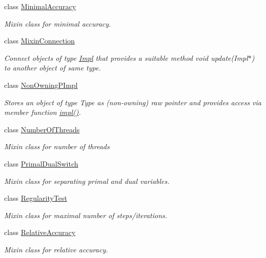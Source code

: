 \begin{DoxyCompactItemize}
class \hyperlink{classSpacy_1_1Mixin_1_1MinimalAccuracy}{Minimal\+Accuracy}
\begin{DoxyCompactList}\small\item\em Mixin class for minimal accuracy. \end{DoxyCompactList}\item 
class \hyperlink{classSpacy_1_1Mixin_1_1MixinConnection}{Mixin\+Connection}
\begin{DoxyCompactList}\small\item\em Connect objects of type \hyperlink{classSpacy_1_1Mixin_1_1Impl}{Impl} that provides a suitable method void update(\+Impl$\ast$) to another object of same type. \end{DoxyCompactList}\item 
class \hyperlink{classSpacy_1_1Mixin_1_1NonOwningPImpl}{Non\+Owning\+P\+Impl}
\begin{DoxyCompactList}\small\item\em Stores an object of type Type as (non-\/owning) raw pointer and provides access via member function \hyperlink{classSpacy_1_1Mixin_1_1NonOwningPImpl_aeeb3e0a5f6fd8f22633040dcf94355f9}{impl()}. \end{DoxyCompactList}\item 
class \hyperlink{classSpacy_1_1Mixin_1_1NumberOfThreads}{Number\+Of\+Threads}
\begin{DoxyCompactList}\small\item\em Mixin class for number of threads \end{DoxyCompactList}\item 
class \hyperlink{classSpacy_1_1Mixin_1_1PrimalDualSwitch}{Primal\+Dual\+Switch}
\begin{DoxyCompactList}\small\item\em Mixin class for separating primal and dual variables. \end{DoxyCompactList}\item 
class \hyperlink{classSpacy_1_1Mixin_1_1RegularityTest}{Regularity\+Test}
\begin{DoxyCompactList}\small\item\em Mixin class for maximal number of steps/iterations. \end{DoxyCompactList}\item 
class \hyperlink{classSpacy_1_1Mixin_1_1RelativeAccuracy}{Relative\+Accuracy}
\begin{DoxyCompactList}\small\item\em Mixin class for relative accuracy. \end{DoxyCompactList}\item 

\end{DoxyCompactItemize}
